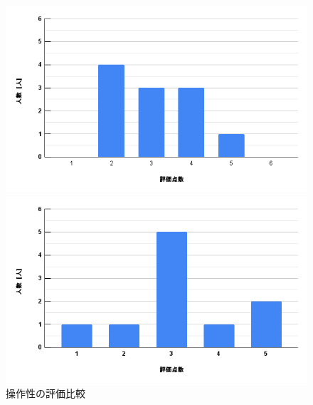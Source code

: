 \documentclass{ltjsreport}
\begin{document}
		\begin{figure}[H]
		\centering
		\begin{minipage}{0.75\columnwidth}
		\centering
		\includegraphics[width = \columnwidth]{../figs/PC-2.png}
		\end{minipage}
		\hspace{0.04\columnwidth}
		\begin{minipage}{0.75\columnwidth}
		\centering
		\includegraphics[width = \columnwidth]{../figs/iOS-2.png}
		\end{minipage}
		\caption{操作性の評価比較}
		\end{figure}
\end{document}

